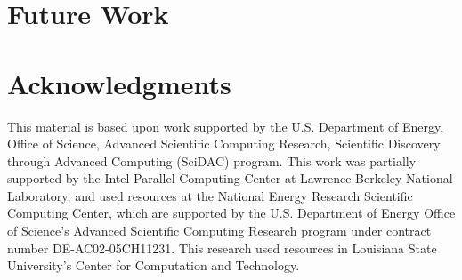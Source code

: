 \documentclass[conference]{IEEEtran}
\begin{document}
\section{Future Work}





\section*{Acknowledgments}

This material is based upon work supported by the U.S. Department of Energy, Office of Science, Advanced Scientific Computing Research, Scientific Discovery through Advanced Computing (SciDAC) program.
This work was partially supported by the Intel Parallel Computing Center at
Lawrence Berkeley National Laboratory,
and used resources at the National Energy Research Scientific Computing Center, which are supported by the U.S. Department of Energy Office of Science's Advanced Scientific Computing Research program under contract number DE-AC02-05CH11231.  
This research used resources in Louisiana State University's Center for Computation and Technology. 





\end{document}
